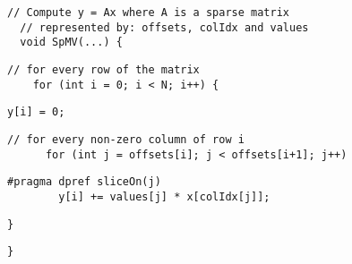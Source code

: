 \begin{lstlisting}[style=cppcode]
  // Compute y = Ax where A is a sparse matrix
  // represented by: offsets, colIdx and values
  void SpMV(...) {
\end{lstlisting}

\begin{lstlisting}[style=cppcode, backgroundcolor=\color{yellow!15}, firstnumber=last]
    // for every row of the matrix
    for (int i = 0; i < N; i++) {
\end{lstlisting}

\begin{lstlisting}[style=cppcode, backgroundcolor=\color{green!15}, firstnumber=last]
      y[i] = 0;
\end{lstlisting}

\begin{lstlisting}[style=cppcode, backgroundcolor=\color{red!15}, firstnumber=last]
      // for every non-zero column of row i
      for (int j = offsets[i]; j < offsets[i+1]; j++)
\end{lstlisting}

\begin{lstlisting}[style=cppcode, backgroundcolor=\color{green!15}, firstnumber=last]
        #pragma dpref sliceOn(j)
        y[i] += values[j] * x[colIdx[j]];
\end{lstlisting}

\begin{lstlisting}[style=cppcode, backgroundcolor=\color{yellow!15}, firstnumber=last]
    }
\end{lstlisting}

\begin{lstlisting}[style=cppcode, firstnumber=last]
  }
\end{lstlisting}
